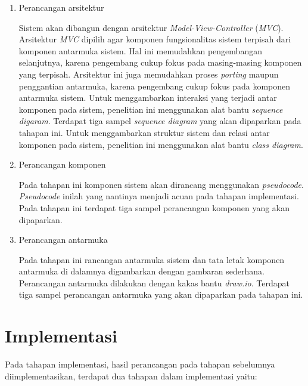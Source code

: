 \begin{enumerate}[
leftmargin=0pt, itemindent=20pt,
labelwidth=15pt, labelsep=5pt, listparindent=0.7cm,
align=left]

\item Perancangan arsitektur

  Sistem akan dibangun dengan arsitektur \emph{Model-View-Controller}
  (\emph{MVC}). Arsitektur \emph{MVC} dipilih agar komponen fungsionalitas
  sistem terpisah dari komponen antarmuka sistem. Hal ini memudahkan
  pengembangan selanjutnya, karena pengembang
  cukup fokus pada masing-masing komponen yang terpisah. Arsitektur ini juga
  memudahkan proses \emph{porting} maupun penggantian antarmuka, karena
  pengembang cukup fokus pada komponen antarmuka sistem. Untuk menggambarkan
  interaksi yang terjadi antar komponen pada sistem, penelitian ini menggunakan
  alat bantu \emph{sequence digaram}. Terdapat tiga sampel \emph{sequence
    diagram} yang akan dipaparkan pada tahapan ini. Untuk menggambarkan struktur
  sistem dan relasi antar komponen pada sistem, penelitian ini menggunakan alat
  bantu \emph{class diagram}.

\item Perancangan komponen

  Pada tahapan ini komponen sistem akan dirancang menggunakan
  \emph{pseudocode}. \emph{Pseudocode} inilah yang nantinya menjadi
  acuan pada tahapan implementasi. Pada tahapan ini terdapat tiga
  sampel perancangan komponen yang akan dipaparkan.

\item Perancangan antarmuka

  Pada tahapan ini rancangan antarmuka sistem dan tata letak komponen antarmuka
  di dalamnya digambarkan dengan gambaran sederhana. Perancangan antarmuka
  dilakukan dengan kakas bantu \emph{draw.io}. Terdapat tiga
  sampel perancangan antarmuka yang akan dipaparkan pada tahapan ini.

\end{enumerate}

\section{Implementasi}

Pada tahapan implementasi, hasil perancangan pada tahapan sebelumnya
diimplementasikan, terdapat dua tahapan dalam implementasi yaitu:

